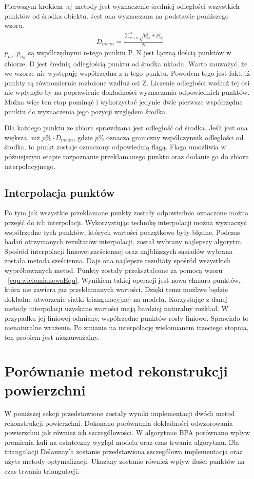 Pierwszym krokiem tej metody jest wyznaczenie średniej odległości wszystkich punktów od środka obiektu. Jest ona wyznaczana na podstawie poniższego wzoru.
\begin{equation}
    \begin{aligned}
            &D_{mean}=\frac{\sum_{n=0}^{N} \sqrt{p_{nx}^2+p_{ny}^2}}{N}  
    \end{aligned}
\end{equation}
$p_{nx},p_{ny}$ są współrzędnymi n-tego punktu P. N jest łączną ilością punktów w zbiorze. D jest średnią odległością punktu od środka układu. Warto zauważyć, że we wzorze nie występuję współrzędna z n-tego punktu. Powodem tego jest fakt, iż punkty są równomiernie rozłożone wzdłuż osi Z. Liczenie odległości wzdłuż tej osi nie wpłynęło by na poprawienie dokładności wyznaczania odpowiednich punktów. Można więc ten etap pominąć i wykorzystać jedynie dwie pierwsze współrzędne punktu do wyznaczenia jego pozycji względem środka.

Dla każdego punktu ze zbioru sprawdzana jest odległość od środka. Jeśli jest ona większa, niż $p\% \cdot D_{mean}$, gdzie $p\%$ oznacza graniczny współczynnik odległości od środka, to punkt zostaje oznaczony odpowiednią flagą. Flaga umożliwia w późniejszym etapie rozpoznanie przekłamanego punktu oraz dodanie go do zbioru interpolacyjnego.
\subsection{Interpolacja punktów}
Po tym jak wszystkie przekłamane punkty zostały odpowiednio oznaczone można przejść do ich interpolacji. Wykorzystując technikę interpolacji można wyznaczyć współrzędne tych punktów, których wartości początkowo były błędne. Podczas badań otrzymanych rezultatów interpolacji, został wybrany najlepszy algorytm. Spośród interpolacji liniowej,sześciennej oraz najbliższych sąsiadów wybrana została metoda sześcienna. Daje ona najlepsze rezultaty spośród wszystkich wypróbowanych metod. Punkty zostały przekształcone za pomocą wzoru ~\ref{equ:wielomianowaEqu}. Wynikiem takiej operacji jest nowa chmura punktów, która nie zawiera już przekłamanych wartości. Dzięki temu możliwe będzie dokładne utworzenie siatki triangulacyjnej na modelu. Korzystając z danej metody interpolacji uzyskane wartości mają bardziej naturalny rozkład. W przypadku jej liniowej odmiany, współrzędne punktów rosły liniowo. Sprawiało to nienaturalne wrażenie. Po zmianie na interpolację wielomianem trzeciego stopnia, ten problem jest niezauważalny.  
\section{Porównanie metod rekonstrukcji powierzchni}
W poniższej sekcji przedstawione zostały wyniki implementacji dwóch metod rekonstrukcji powierzchni. Dokonano porównania dokładności odwzorowania powierzchni jak również ich szczegółowości. W algorytmie BPA porównano wpływ promienia kuli na ostateczny wygląd modelu oraz czas trwania algorytmu. Dla triangulacji Delaunay'a zostanie przedstawiona szczegółowa implementacja oraz użyte metody optymalizacji. Ukazany zostanie również wpływ ilości punktów na czas trwania triangulacji.


